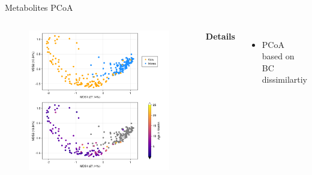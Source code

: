 
\begin{frame}{Metabolites PCoA}
    \begin{columns}[c] %

    
        \begin{figure}
        \includegraphics[width=1\linewidth]{../figures/metabolites_pcoa.png}
        \end{figure}

    
        \textbf{Details}
        \begin{itemize}
            \item PCoA based on BC dissimilartiy
        \end{itemize}

    \end{columns}

\end{frame}

